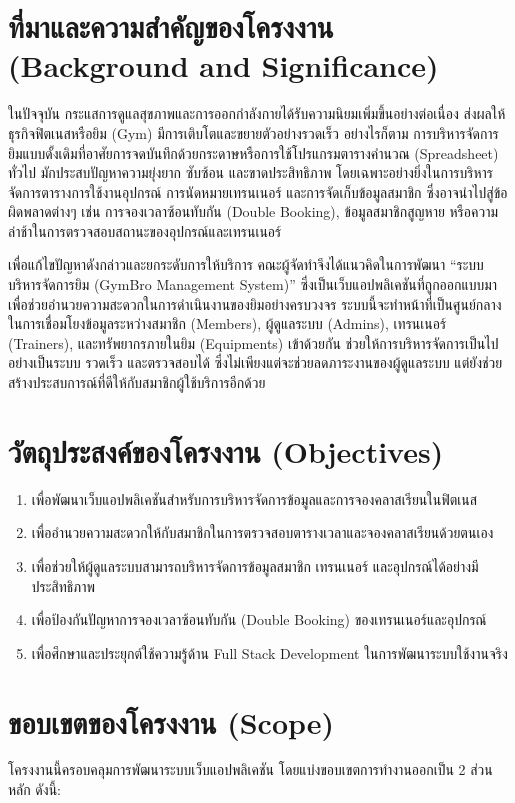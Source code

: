 \section{ที่มาและความสำคัญของโครงงาน (Background and Significance)}
ในปัจจุบัน กระแสการดูแลสุขภาพและการออกกำลังกายได้รับความนิยมเพิ่มขึ้นอย่างต่อเนื่อง ส่งผลให้ธุรกิจฟิตเนสหรือยิม (Gym) มีการเติบโตและขยายตัวอย่างรวดเร็ว อย่างไรก็ตาม การบริหารจัดการยิมแบบดั้งเดิมที่อาศัยการจดบันทึกด้วยกระดาษหรือการใช้โปรแกรมตารางคำนวณ (Spreadsheet) ทั่วไป มักประสบปัญหาความยุ่งยาก ซับซ้อน และขาดประสิทธิภาพ โดยเฉพาะอย่างยิ่งในการบริหารจัดการตารางการใช้งานอุปกรณ์ การนัดหมายเทรนเนอร์ และการจัดเก็บข้อมูลสมาชิก ซึ่งอาจนำไปสู่ข้อผิดพลาดต่างๆ เช่น การจองเวลาซ้อนทับกัน (Double Booking), ข้อมูลสมาชิกสูญหาย หรือความล่าช้าในการตรวจสอบสถานะของอุปกรณ์และเทรนเนอร์

เพื่อแก้ไขปัญหาดังกล่าวและยกระดับการให้บริการ คณะผู้จัดทำจึงได้แนวคิดในการพัฒนา ``ระบบบริหารจัดการยิม (GymBro Management System)'' ซึ่งเป็นเว็บแอปพลิเคชันที่ถูกออกแบบมาเพื่อช่วยอำนวยความสะดวกในการดำเนินงานของยิมอย่างครบวงจร ระบบนี้จะทำหน้าที่เป็นศูนย์กลางในการเชื่อมโยงข้อมูลระหว่างสมาชิก (Members), ผู้ดูแลระบบ (Admins), เทรนเนอร์ (Trainers), และทรัพยากรภายในยิม (Equipments) เข้าด้วยกัน ช่วยให้การบริหารจัดการเป็นไปอย่างเป็นระบบ รวดเร็ว และตรวจสอบได้ ซึ่งไม่เพียงแต่จะช่วยลดภาระงานของผู้ดูแลระบบ แต่ยังช่วยสร้างประสบการณ์ที่ดีให้กับสมาชิกผู้ใช้บริการอีกด้วย

\section{วัตถุประสงค์ของโครงงาน (Objectives)}
\begin{enumerate}
    \item เพื่อพัฒนาเว็บแอปพลิเคชันสำหรับการบริหารจัดการข้อมูลและการจองคลาสเรียนในฟิตเนส
    \item เพื่ออำนวยความสะดวกให้กับสมาชิกในการตรวจสอบตารางเวลาและจองคลาสเรียนด้วยตนเอง
    \item เพื่อช่วยให้ผู้ดูแลระบบสามารถบริหารจัดการข้อมูลสมาชิก เทรนเนอร์ และอุปกรณ์ได้อย่างมีประสิทธิภาพ
    \item เพื่อป้องกันปัญหาการจองเวลาซ้อนทับกัน (Double Booking) ของเทรนเนอร์และอุปกรณ์
    \item เพื่อศึกษาและประยุกต์ใช้ความรู้ด้าน Full Stack Development ในการพัฒนาระบบใช้งานจริง
\end{enumerate}

\section{ขอบเขตของโครงงาน (Scope)}
โครงงานนี้ครอบคลุมการพัฒนาระบบเว็บแอปพลิเคชัน โดยแบ่งขอบเขตการทำงานออกเป็น 2 ส่วนหลัก ดังนี้:

